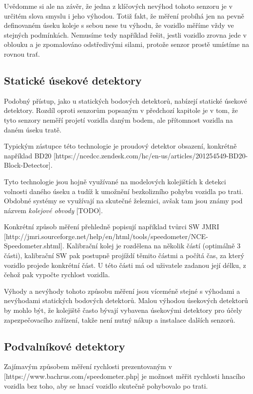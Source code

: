 \documentclass[12pt,a4paper]{article}
\begin{document}
Uvědomme si ale na závěr, že jedna z klíčových nevýhod tohoto senzoru je v
určitém slova smyslu i jeho výhodou. Totiž fakt, že měření probíhá jen na pevně
definovaném úseku koleje s sebou nese tu výhodu, že vozidlo měříme vždy ve
stejných podmínkách. Nemusíme tedy například řešit, jestli vozidlo zrovna jede
v oblouku a je zpomalováno odstředivými silami, protože senzor prostě umístíme
na rovnou trať.

\subsection{Statické úsekové detektory}

Podobný přístup, jako u statických bodových detektorů, nabízejí statické úsekové
detektory. Rozdíl oproti senzorům popsaným v předchozí kapitole je v tom, že
tyto senzory neměří projetí vozidla daným bodem, ale přítomnost vozidla na daném
úseku tratě.

Typickým zástupce této technologie je proudový detektor obsazení, konkrétně
například BD20 [https://ncedcc.zendesk.com/hc/en-us/articles/201254549-BD20-Block-Detector].

Tyto technologie jsou hojně využívané na modelových kolejištích k detekci
volnosti daného úseku a tudíž k umožnění bezkolizního pohybu vozidla po trati.
Obdobné systémy se využívají na skutečné železnici, avšak tam jsou známy pod
názvem \textit{kolejové obvody} [TODO].

Konkrétní způsob měření přehledně popisují například tvůrci SW JMRI
[http://jmri.sourceforge.net/help/en/html/tools/speedometer/NCE-Speedometer.shtml].
Kalibrační kolej je rozdělena na několik částí (optimálně 3 části), kalibrační
SW pak postupně projíždí těmito částmi a počítá čas, za který vozidlo projede
konkrétní část. U této části má od uživatele zadanou její délku, z čehož pak
vypočte rychlost vozidla.

Výhody a nevýhody tohoto způsobu měření jsou víceméně stejné s výhodami a
nevýhodami statických bodových detektorů. Malou výhodou úsekových detektorů by
mohlo být, že kolejiště často bývají vybavena úsekovými detektory pro účely
zapezpečovacího zařízení, takže není nutný nákup a instalace dalších senzorů.

\subsection{Podvalníkové detektory}

Zajímavým způsobem měření rychlosti prezentovaným v [https://www.bachrus.com/speedometer.php]
je možnost měřit rychlosti hnacího vozidla bez toho, aby se hnací vozidlo
skutečně pohybovalo po trati.
\end{document}
